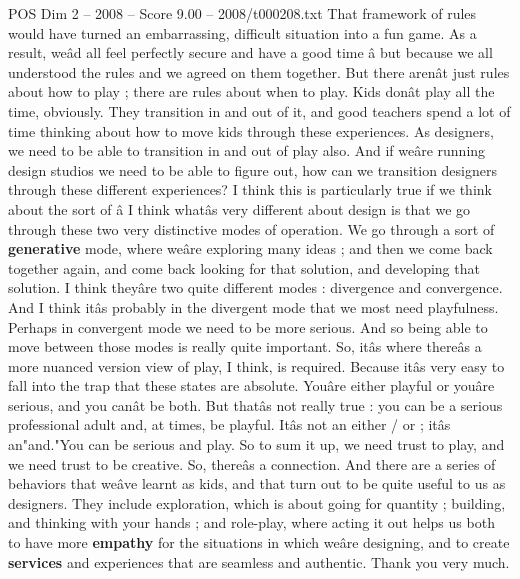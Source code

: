 \begin{textsample}{POS Dim 2 – 2008 – Score 9.00 – 2008/t000208.txt}
That framework of rules would have turned an embarrassing, difficult situation into a fun game.
As a result, weâd all feel perfectly secure and have a good time â but because we all understood the rules and we agreed on them together.
But there arenât just rules about how to play ; there are rules about when to play.
Kids donât play all the time, obviously.
They transition in and out of it, and good teachers spend a lot of time thinking about how to move kids through these experiences.
As designers, we need to be able to transition in and out of play also.
And if weâre running design studios we need to be able to figure out, how can we transition designers through these different experiences?
I think this is particularly true if we think about the sort of â I think whatâs very different about design is that we go through these two very distinctive modes of operation.
We go through a sort of \textbf{generative} mode, where weâre exploring many ideas ; and then we come back together again, and come back looking for that solution, and developing that solution.
I think theyâre two quite different modes : divergence and convergence.
And I think itâs probably in the divergent mode that we most need playfulness.
Perhaps in convergent mode we need to be more serious.
And so being able to move between those modes is really quite important.
So, itâs where thereâs a more nuanced version view of play, I think, is required.
Because itâs very easy to fall into the trap that these states are absolute.
Youâre either playful or youâre serious, and you canât be both.
But thatâs not really true : you can be a serious professional adult and, at times, be playful.
Itâs not an either / or ; itâs an"and."You can be serious and play.
So to sum it up, we need trust to play, and we need trust to be creative.
So, thereâs a connection.
And there are a series of behaviors that weâve learnt as kids, and that turn out to be quite useful to us as designers.
They include exploration, which is about going for quantity ; building, and thinking with your hands ; and role-play, where acting it out helps us both to have more \textbf{empathy} for the situations in which weâre designing, and to create \textbf{services} and experiences that are seamless and authentic.
Thank you very much.

\end{textsample}
